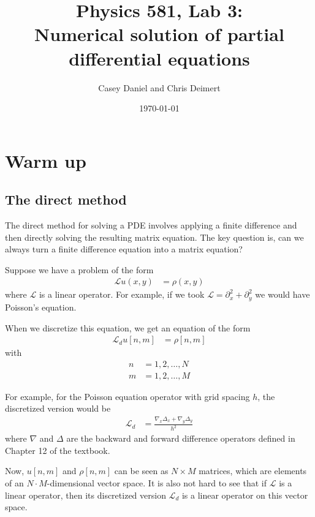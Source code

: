 \documentclass[twocolumn]{myarticle}
\begin{document}
\title{Physics 581, Lab 3:\\Numerical solution of partial differential equations}
\author{Casey Daniel and Chris Deimert}
\date{\today}

\maketitle

\section{Warm up}
\label{sec:warm_up}

\subsection{The direct method}
\label{subsec:the_direct_method}

The direct method for solving a PDE involves applying a finite difference and then directly solving the resulting matrix equation.
The key question is, can we always turn a finite difference equation into a matrix equation?

Suppose we have a problem of the form
\begin{align}
    \mathcal{L} u(x, y) &= \rho(x, y)
\end{align}
where $ \mathcal{L} $ is a linear operator.
For example, if we took $ \mathcal{L} = \partial_x^2 + \partial_y^2 $ we would have Poisson's equation.

When we discretize this equation, we get an equation of the form
\begin{align}
    \mathcal{L}_d u[n,m] &= \rho[n, m] \label{eq:general_difference_eq}
\end{align}
with
\begin{align}
    n &= 1, 2, \ldots, N
    \\
    m &= 1, 2, \ldots, M
\end{align}

For example, for the Poisson equation operator with grid spacing $ h $, the discretized version would be
\begin{align}
    \mathcal{L}_d &= \frac{\nabla_x \Delta_x + \nabla_y \Delta_y}{h^2}
\end{align}
where $ \nabla $ and $ \Delta $ are the backward and forward difference operators defined in Chapter 12 of the textbook.

Now, $ u[n,m] $ and $ \rho[n,m] $ can be seen as $ N\times M $ matrices, which are elements of an $ N \cdot M $-dimensional vector space.
It is also not hard to see that if $ \mathcal{L} $ is a linear operator, then its discretized version $ \mathcal{L}_d $ is a linear operator on this vector space.
\end{document}
